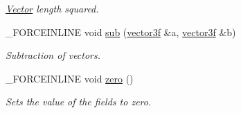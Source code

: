 \begin{DoxyCompactItemize}
\begin{DoxyCompactList}\small\item\em \hyperlink{classbt_1_1_vector}{Vector} length squared. \end{DoxyCompactList}\item 
\hypertarget{classbt_1_1vector3f_a196b115c09c963ebd5e9200a245bc5e3}{\-\_\-\-F\-O\-R\-C\-E\-I\-N\-L\-I\-N\-E void \hyperlink{classbt_1_1vector3f_a196b115c09c963ebd5e9200a245bc5e3}{sub} (\hyperlink{classbt_1_1vector3f}{vector3f} \&a, \hyperlink{classbt_1_1vector3f}{vector3f} \&b)}\label{classbt_1_1vector3f_a196b115c09c963ebd5e9200a245bc5e3}

\begin{DoxyCompactList}\small\item\em Subtraction of vectors. \end{DoxyCompactList}\item 
\hypertarget{classbt_1_1vector3f_a8aa699dea5609aa06a7895966ad9309d}{\-\_\-\-F\-O\-R\-C\-E\-I\-N\-L\-I\-N\-E void \hyperlink{classbt_1_1vector3f_a8aa699dea5609aa06a7895966ad9309d}{zero} ()}\label{classbt_1_1vector3f_a8aa699dea5609aa06a7895966ad9309d}

\begin{DoxyCompactList}\small\item\em Sets the value of the fields to zero. \end{DoxyCompactList}\end{DoxyCompactItemize}
